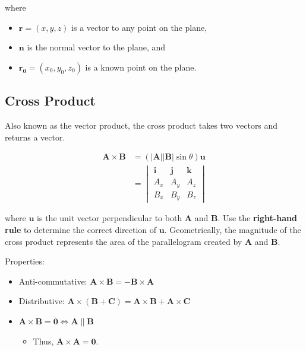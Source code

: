 where
\begin{itemize}
    \item $\mathbf{r} = (x, y, z)$ is a vector to any point on the plane,
    \item $\mathbf{n}$ is the normal vector to the plane, and
    \item $\mathbf{r_0} = (x_0, y_0, z_0)$ is a known point on the plane.
\end{itemize}

\subsection{Cross Product}

Also known as the vector product, the cross product takes two vectors and returns a vector.

\begin{align*}
    \mathbf{A} \times \mathbf{B} & = (|\mathbf{A}||\mathbf{B}|\sin\theta)\mathbf{u} \\
                                 & = \begin{vmatrix}
                                         \mathbf{i} & \mathbf{j} & \mathbf{k} \\
                                         A_x        & A_y        & A_z        \\
                                         B_x        & B_y        & B_z
                                     \end{vmatrix}
\end{align*}

where $\mathbf{u}$ is the unit vector perpendicular to both $\mathbf{A}$ and $\mathbf{B}$. Use the \textbf{right-hand rule} to determine the correct direction of $\mathbf{u}$. Geometrically, the magnitude of the cross product represents the area of the parallelogram created by $\mathbf{A}$ and $\mathbf{B}$.

\vsp

Properties:
\begin{itemize}
    \item Anti-commutative: $\mathbf{A} \times \mathbf{B} = -\mathbf{B} \times \mathbf{A}$
    \item Distributive: $\mathbf{A} \times (\mathbf{B} + \mathbf{C}) = \mathbf{A} \times \mathbf{B} + \mathbf{A} \times \mathbf{C}$
    \item $\mathbf{A} \times \mathbf{B} = \mathbf{0} \iff \mathbf{A} \parallel \mathbf{B}$
          \begin{itemize}
              \item Thus, $\mathbf{A} \times \mathbf{A} = \mathbf{0}$.
          \end{itemize}
\end{itemize}

